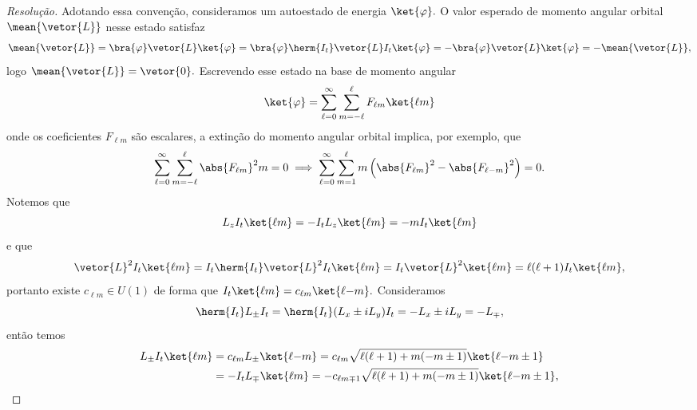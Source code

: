\begin{proof}[Resolução]
    Adotando essa convenção, consideramos um autoestado de energia \(\ket{\varphi}.\) O valor esperado de momento angular orbital \(\mean{\vetor{L}}\) nesse estado satisfaz
    \begin{equation*}
        \mean{\vetor{L}} = \bra{\varphi} \vetor{L} \ket{\varphi} = \bra{\varphi} \herm{I_t}\vetor{L} I_t \ket{\varphi} = - \bra{\varphi}\vetor{L}\ket{\varphi} = - \mean{\vetor{L}},
    \end{equation*}
    logo \(\mean{\vetor{L}} = \vetor{0}.\) Escrevendo esse estado na base de momento angular
    \begin{equation*}
        \ket{\varphi} = \sum_{\ell = 0}^{\infty} \sum_{m = -\ell}^{\ell} F_{\ell m} \ket{\ell m}
    \end{equation*}
    onde os coeficientes \(F_{\ell m}\) são escalares, a extinção do momento angular orbital implica, por exemplo, que
    \begin{equation*}
        \sum_{\ell = 0}^{\infty} \sum_{m= - \ell}^\ell \abs{F_{\ell m}}^2 m = 0 \implies  \sum_{\ell = 0}^\infty \sum_{m = 1}^\ell m \left(\abs{F_{\ell m}}^2 - \abs{F_{\ell {-m}}}^2\right) = 0.
    \end{equation*}
    Notemos que
    \begin{equation*}
        L_zI_t\ket{\ell m} = - I_t L_z \ket{\ell m} = - m I_t \ket{\ell m}
    \end{equation*}
    e que
    \begin{equation*}
        \vetor{L}^2 I_t \ket{\ell m} = I_t \herm{I_t} \vetor{L}^2 I_t \ket{\ell m} = I_t \vetor{L}^2 \ket{\ell m} = \ell (\ell + 1) I_t \ket{\ell m},
    \end{equation*}
    portanto existe \(c_{\ell m} \in U(1)\) de forma que \(I_t \ket{\ell m} = c_{\ell m} \ket{\ell {-m}}.\) Consideramos
    \begin{equation*}
        \herm{I_t} L_\pm I_t = \herm{I_t} (L_x \pm i L_y) I_t = - L_x \pm i L_y = - L_\mp,
    \end{equation*}
    então temos
    \begin{align*}
        L_{\pm} I_t \ket{\ell m} &= c_{\ell m} L_{\pm} \ket{\ell {-m}} = c_{\ell m} \sqrt{\ell(\ell + 1) + m(-m \pm 1)} \ket{\ell {-m \pm 1}}\\
                                 &= -I_t L_{\mp}\ket{\ell m} 
                                 = - c_{\ell m \mp 1}\sqrt{\ell(\ell + 1) + m(-m \pm 1)} \ket{\ell {-m}\pm 1},
    \end{align*}

\end{proof}
